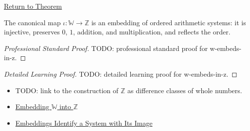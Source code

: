 \newpage
{}
\label{prf:w-embeds-in-z}

\begin{remark*}[Return]
\hyperref[thm:w-embeds-in-z]{Return to Theorem}
\end{remark*}

\begin{theorem*}[$W$ Embeds in $Z$]
The canonical map $\iota:\mathbb{W}\to \mathbb{Z}$ is an embedding of ordered arithmetic systems: it is injective, preserves $0$, $1$, addition, and multiplication, and reflects the order.
\end{theorem*}

\begin{proof}[Professional Standard Proof]
\LRAProofBodyStart
TODO: professional standard proof for w-embeds-in-z.
\end{proof}

\begin{proof}[Detailed Learning Proof]
\LRAProofBodyStart
TODO: detailed learning proof for w-embeds-in-z.
\end{proof}

\begin{remark*}
\end{remark*}

\begin{dependencies}
\begin{itemize}
  \item TODO: link to the construction of $\mathbb{Z}$ as difference classes of whole numbers.
  \item \hyperref[def:embedding-w-into-z]{Embedding $\mathbb{W}$ into $\mathbb{Z}$}
  \item \hyperref[thm:embedding-identifies-with-image]{Embeddings Identify a System with Its Image}
\end{itemize}
\end{dependencies}

\clearpage

